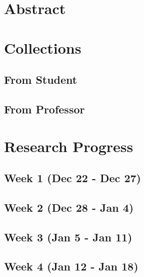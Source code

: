 \documentclass[a4paper,10pt,twoside]{report}
\author{\me}
\begin{document}


\normalsize

\chapter*{Abstract}\label{chapter:Abstract}
\setcounter{page}{0}


\tableofcontents












\chapter{Collections}\label{chapter:Introduction}

\section{From Student}

\section{From Professor}


 
\chapter{Research Progress}\label{chapter:Research Progress}


\section{Week 1 (Dec 22 - Dec 27)}


\section{Week 2 (Dec 28 - Jan 4)}


\section{Week 3 (Jan 5 - Jan 11)}
\section{Week 4 (Jan 12 - Jan 18)}
 
\end{document}
